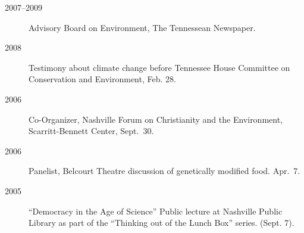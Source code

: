 \documentclass[10pt]{article}
\begin{document}
\begin{description}
        	\item[2007--2009] Advisory Board on Environment, The Tennessean Newspaper.
        	\item[2008] Testimony about climate change before Tennessee House Committee on Conservation and Environment, Feb. 28.
        	\item[2006] Co-Organizer, Nashville Forum on Christianity and the Environment, Scarritt-Bennett Center, Sept.~30.
        	\item[2006] Panelist, Belcourt Theatre discussion of genetically modified food. Apr.~7.
            \item[2005] ``Democracy in the Age of Science'' Public lecture at Nashville Public Library as part of the ``Thinking out of the Lunch Box'' series. (Sept. 7).
        \end{description}
\end{document}
